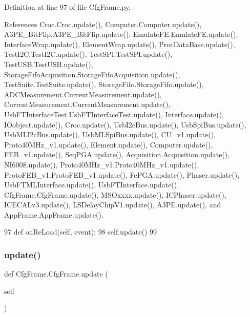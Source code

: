 Definition at line 97 of file Cfg\+Frame.\+py.



References Croc.\+Croc.\+update(), Computer.\+Computer.\+update(), A3\+P\+E\+\_\+\+Bit\+Flip.\+A3\+P\+E\+\_\+\+Bit\+Flip.\+update(), Emulate\+F\+E.\+Emulate\+F\+E.\+update(), Interface\+Wrap.\+update(), Element\+Wrap.\+update(), Proc\+Data\+Base.\+update(), Test\+I2\+C.\+Test\+I2\+C.\+update(), Test\+S\+P\+I.\+Test\+S\+P\+I.\+update(), Test\+U\+S\+B.\+Test\+U\+S\+B.\+update(), Storage\+Fifo\+Acquisition.\+Storage\+Fifo\+Acquisition.\+update(), Test\+Suite.\+Test\+Suite.\+update(), Storage\+Fifo.\+Storage\+Fifo.\+update(), A\+D\+C\+Measurement.\+Current\+Measurement.\+update(), Current\+Measurement.\+Current\+Measurement.\+update(), Usb\+F\+T\+Interface\+Test.\+Usb\+F\+T\+Interface\+Test.\+update(), Interface.\+update(), I\+Oobject.\+update(), Croc.\+update(), Usb\+I2c\+Bus.\+update(), Usb\+Spi\+Bus.\+update(), Usb\+M\+L\+I2c\+Bus.\+update(), Usb\+M\+L\+Spi\+Bus.\+update(), C\+U\+\_\+v1.\+update(), Proto40\+M\+Hz\+\_\+v1.\+update(), Element.\+update(), Computer.\+update(), F\+E\+B\+\_\+v1.\+update(), Seq\+P\+G\+A.\+update(), Acquisition.\+Acquisition.\+update(), N\+I6008.\+update(), Proto40\+M\+Hz\+\_\+v1.\+Proto40\+M\+Hz\+\_\+v1.\+update(), Proto\+F\+E\+B\+\_\+v1.\+Proto\+F\+E\+B\+\_\+v1.\+update(), Fe\+P\+G\+A.\+update(), Phaser.\+update(), Usb\+F\+T\+M\+L\+Interface.\+update(), Usb\+F\+T\+Interface.\+update(), Cfg\+Frame.\+Cfg\+Frame.\+update(), M\+S\+Oxxxx.\+update(), I\+C\+Phaser.\+update(), I\+C\+E\+C\+A\+Lv3.\+update(), L\+S\+Delay\+Chip\+V1.\+update(), A3\+P\+E.\+update(), and App\+Frame.\+App\+Frame.\+update().


\begin{DoxyCode}
97     \textcolor{keyword}{def }onReLoad(self, event):
98         self.update()
99 
\end{DoxyCode}
\mbox{\label{classCfgFrame_1_1CfgFrame_af1662dd55c7c073239f392f7927791d3}} 
\subsubsection{\texorpdfstring{update()}{update()}}
{\footnotesize\ttfamily def Cfg\+Frame.\+Cfg\+Frame.\+update (\begin{DoxyParamCaption}\item[{}]{self }\end{DoxyParamCaption})}



